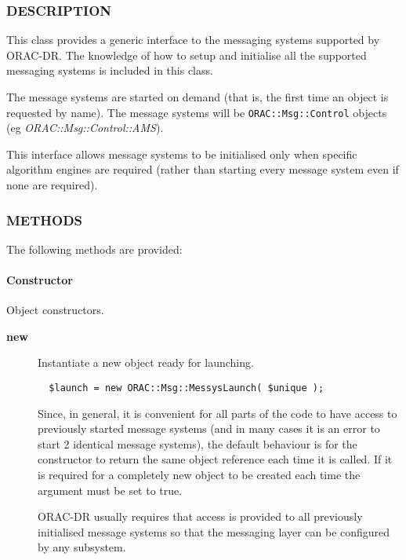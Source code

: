 \subsubsection*{DESCRIPTION\label{ORAC::Msg::MessysLaunch_DESCRIPTION}}


This class provides a generic interface to the messaging systems
supported by ORAC-DR. The knowledge of how to setup and initialise
all the supported messaging systems is included in this class.



The message systems are started on demand (that is, the first
time an object is requested by name). The message systems will
be \texttt{ORAC::Msg::Control} objects (eg \emph{ORAC::Msg::Control::AMS}).



This interface allows message systems to be initialised only
when specific algorithm engines are required (rather than
starting every message system even if none are required).

\subsubsection*{METHODS\label{ORAC::Msg::MessysLaunch_METHODS}}


The following methods are provided:

\paragraph*{Constructor\label{ORAC::Msg::MessysLaunch_Constructor}}


Object constructors.

\begin{description}

\item[{\textbf{new}}] \mbox{}

Instantiate a new object ready for launching.

\begin{verbatim}
  $launch = new ORAC::Msg::MessysLaunch( $unique );
\end{verbatim}


Since, in general, it is convenient for all parts of the code to have
access to previously started message systems (and in many cases it is
an error to start 2 identical message systems), the default behaviour
is for the constructor to return the same object reference each time
it is called. If it is required for a completely new object to be
created each time the argument must be set to true.



ORAC-DR usually requires that access is provided to all previously
initialised message systems so that the messaging layer can be
configured by any subsystem.

\end{description}
